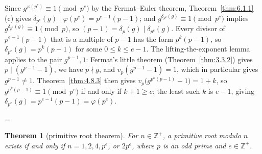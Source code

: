 \documentclass[11pt]{article}
\makeatletter
\theoremstyle{ntstyle}
\newtheorem{theorem}{Theorem}[subsection]
\let\nt@closedisplay\]
\def\nt@guardedclose{\@ifnextchar\par{\nt@closeafterpar}{\@ifnextchar\end{\postdisplaypenalty\@M\nt@closedisplay}{\nt@closedisplay}}}
\def\nt@closeafterpar\par{\@ifnextchar\par{\nt@closeafterpar}{\@ifnextchar\end{\postdisplaypenalty\@M\nt@closedisplay\par}{\nt@closedisplay\par}}}
\renewenvironment{proof}[1][\proofname]{\par
  \pushQED{\qed}\normalfont\topsep\medskipamount\edef\nt@afterproof{\@endparpenalty=\the\@endparpenalty\relax}\@beginparpenalty\@M\@endparpenalty\@M\let\]\nt@guardedclose\trivlist\item[]\textit{#1\@addpunct{.}} \ignorespaces}{\ifvmode\addpenalty\@M\fi\popQED\nt@afterproof\endtrivlist\@endpefalse}
\makeatother
\begin{document}
\begin{proof} Since $g^{\varphi(p^e)}\equiv1\pmod{p^e}$ by the
	Fermat--Euler theorem, Theorem~\ref{thm:6.1.1}(c) gives
	$\delta_{p^e}(g)\mid\varphi(p^e)=p^{e-1}(p-1)$; and
	$g^{\delta_{p^e}(g)}\equiv1\pmod{p^e}$ implies
	$g^{\delta_{p^e}(g)}\equiv1\pmod{p}$, so
	$(p-1)=\delta_p(g)\mid\delta_{p^e}(g)$. Every divisor of $p^{e-1}(p-1)$ that
	is a multiple of $p-1$ has the form $p^{k}(p-1)$, so
	$\delta_{p^e}(g)=p^{k}(p-1)$ for some $0\le k\le e-1$. The lifting-the-exponent lemma applies to the pair $g^{p-1},1$: Fermat's little
	theorem (Theorem~\ref{thm:3.3.2}) gives $p\mid(g^{p-1}-1)$, we have
	$p\nmid g$, and
	$v_p(g^{p-1}-1)=1$, which in particular gives $g^{p-1}\neq1$. Theorem~\ref{thm:4.8.3} then gives $v_p\big(g^{p^{k}(p-1)}-1\big)=1+k$, so
	$g^{p^{k}(p-1)}\equiv1\pmod{p^e}$ if and only if $k+1\ge e$; the least such
	$k$ is $e-1$, giving $\delta_{p^e}(g)=p^{e-1}(p-1)=\varphi(p^e)$.

\end{proof}
\begin{theorem}[primitive root theorem]\label{thm:6.2.6}
	For $n \in \mathbb{Z}^+$, a primitive root modulo $n$ exists if and
	only if $n = 1, 2, 4,
		p^{e}$, or $2 p^{e}$, where $p$ is an odd prime and $e \in \mathbb{Z}^+$.

\end{theorem}
\end{document}
